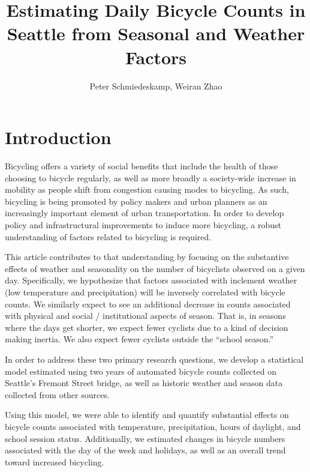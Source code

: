 \documentclass[12pt,letterpaper,article,twocolumn]{memoir}
\title{Estimating Daily Bicycle Counts in Seattle from Seasonal and Weather Factors}
\author{Peter Schmiedeskamp, Weiran Zhao}
\begin{document}
\maketitle

\section*{Introduction}
%
% 

Bicycling offers a variety of social benefits that include the health
of those choosing to bicycle regularly, as well as more broadly a
society-wide increase in mobility as people shift from congestion
causing modes to bicycling. As such, bicycling is being promoted by
policy makers and urban planners as an increasingly important element
of urban transportation. In order to develop policy and
infrastructural improvements to induce more bicycling, a robust
understanding of factors related to bicycling is required.

This article contributes to that understanding by focusing on the
substantive effects of weather and seasonality on the number of
bicyclists observed on a given day. Specifically, we hypothesize that
factors associated with inclement weather (low temperature and
precipitation) will be inversely correlated with bicycle counts. We
similarly expect to see an additional decrease in counts associated
with physical and social / institutional aspects of season. That is, in seasons
where the days get shorter, we expect fewer cyclists due to a kind of
decision making inertia. We also expect fewer cyclists outside
the ``school season.''

In order to address these two
primary research questions, we develop a statistical model estimated
using two years of automated bicycle counts collected on Seattle's
Fremont Street bridge, as well as historic weather and season data
collected from other sources.

Using this model, we were able to identify and quantify substantial
effects on bicycle counts associated with temperature, precipitation,
hours of daylight, and school session status. Additionally, we
estimated changes in bicycle numbers associated with the day of the
week and holidays, as well as an overall trend toward increased
bicycling.
\end{document}
